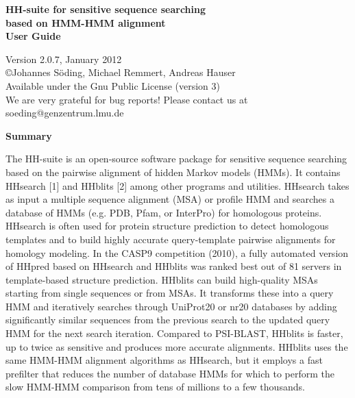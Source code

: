 \documentclass[11pt,a4paper]{article}
\begin{document}


\begin{center}

\vspace{20mm}
 
{\huge \bf HH-suite for sensitive sequence searching\\[2mm] based on HMM-HMM alignment}\\[4mm] 

{\Large \bf User Guide}

  Version 2.0.7, January 2012\\[2mm]
{\copyright  Johannes S\"oding, Michael Remmert, Andreas Hauser}\\[2mm]
Available under the Gnu Public License (version 3)\\[2mm]
We are very grateful for bug reports! Please contact us at soeding@genzentrum.lmu.de

{\bf \Large Summary}

\end{center}

\noindent The HH-suite is an open-source software package for sensitive sequence searching based on the pairwise alignment of hidden Markov models (HMMs). It contains HHsearch [1] and HHblits [2] among other programs and utilities. HHsearch takes as input a multiple sequence alignment (MSA) or profile HMM and searches a database of HMMs (e.g. PDB, Pfam, or InterPro) for homologous proteins. HHsearch is often used for protein structure prediction to detect homologous templates and to build highly accurate query-template pairwise alignments for homology modeling. In the CASP9 competition (2010), a fully automated version of HHpred based on HHsearch and HHblits was ranked best out of 81 servers in template-based structure prediction. HHblits can build high-quality MSAs starting from single sequences or from MSAs. It transforms these into a query HMM and iteratively searches through UniProt20 or nr20 databases by adding significantly similar sequences from the previous search to the updated query HMM for the next search iteration. Compared to PSI-BLAST, HHblits is faster, up to twice as sensitive and produces more accurate alignments. HHblits uses the same HMM-HMM alignment algorithms as HHsearch, but it employs a fast prefilter that reduces the number of database HMMs for which to perform the slow HMM-HMM comparison from tens of millions to a few thousands. \\[2mm]
\end{document}
